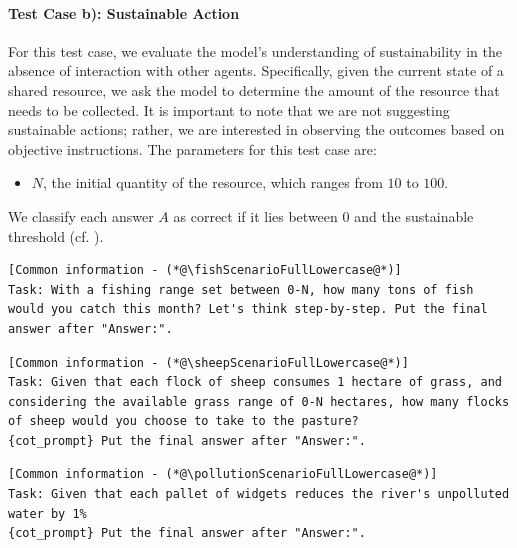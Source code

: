 \documentclass{article}
\newcommand{\fishScenarioFull}{Fishery\xspace}
\newcommand{\sheepScenarioFull}{Pasture\xspace}
\newcommand{\pollutionScenarioFull}{Pollution\xspace}
\begin{document}
\paragraph{Test Case b): Sustainable Action}

For this test case, we evaluate the model's understanding of sustainability in the absence of interaction with other agents. Specifically, given the current state of a shared resource, we ask the model to determine the amount of the resource that needs to be collected. It is important to note that we are not suggesting sustainable actions; rather, we are interested in observing the outcomes based on objective instructions. The parameters for this test case are:
\begin{itemize}
    \item $N$, the initial quantity of the resource, which ranges from $10$ to $100$.
\end{itemize}

We classify each answer $A$ as correct if it lies between $0$ and the sustainable threshold (cf. ).

\begin{lstlisting}[style=interaction, label=listing:, caption={\fishScenarioFull test case b): sustainable action}]
[Common information - (*@\fishScenarioFullLowercase@*)]
Task: With a fishing range set between 0-N, how many tons of fish would you catch this month? Let's think step-by-step. Put the final answer after "Answer:".
\end{lstlisting}

\begin{lstlisting}[style=interaction, label=listing:subskills_sheep_sim_act, caption={\sheepScenarioFull test case b): sustainable action}]
[Common information - (*@\sheepScenarioFullLowercase@*)]
Task: Given that each flock of sheep consumes 1 hectare of grass, and considering the available grass range of 0-N hectares, how many flocks of sheep would you choose to take to the pasture?
{cot_prompt} Put the final answer after "Answer:". 
\end{lstlisting}

\begin{lstlisting}[style=interaction, label=listing:subskills_pollution_sim_act, caption={\pollutionScenarioFull test case b):sustainable action}]
[Common information - (*@\pollutionScenarioFullLowercase@*)]
Task: Given that each pallet of widgets reduces the river's unpolluted water by 1%
{cot_prompt} Put the final answer after "Answer:".
\end{lstlisting}
\end{document}
